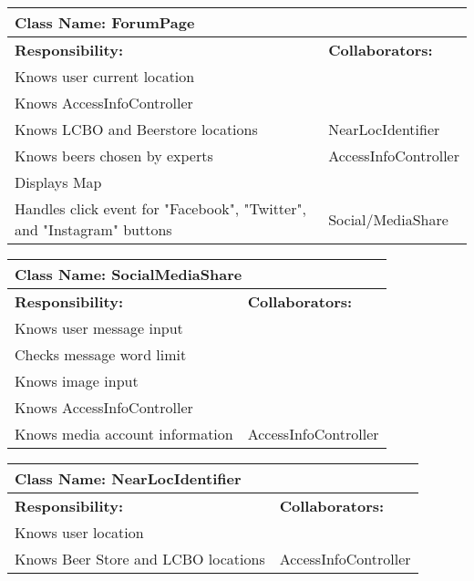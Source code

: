 \documentclass[]{article}
\begin{document}
	\begin{table}[ht]
		\centering
		\begin{tabular}{|p{5cm}|p{5cm}|}
		\hline 
		\multicolumn{2}{|l|}{\textbf{Class Name: ForumPage}} \\
		\hline
		\textbf{Responsibility:} & \textbf{Collaborators:} \\
		\hline
		Knows user current location  & \\
		\hline
		Knows AccessInfoController & \\
		\hline
		Knows LCBO and Beerstore locations & NearLocIdentifier\\
		\hline
		Knows beers chosen by experts & AccessInfoController\\
		\hline
	    Displays Map  & \\
	    \hline
		Handles click event for "Facebook", "Twitter", and "Instagram" buttons & Social/MediaShare\\
		\hline
		\end{tabular}
	\end{table}	

	\begin{table}[ht]
		\centering
		\begin{tabular}{|p{5cm}|p{5cm}|}
			\hline 
			\multicolumn{2}{|l|}{\textbf{Class Name: SocialMediaShare}} \\
			\hline
			\textbf{Responsibility:} & \textbf{Collaborators:} \\
			\hline
			Knows user message input  & \\
			\hline
			Checks message word limit & \\
			\hline
			Knows image input & \\
			\hline
			Knows AccessInfoController & \\
			\hline
			Knows media account information & AccessInfoController\\
			\hline 
		\end{tabular}
	\end{table}	
	
	\begin{table}[ht]
		\centering
		\begin{tabular}{|p{5cm}|p{5cm}|}
			\hline 
			\multicolumn{2}{|l|}{\textbf{Class Name: NearLocIdentifier}} \\
			\hline
			\textbf{Responsibility:} & \textbf{Collaborators:} \\
			\hline
			Knows user location & \\
			\hline
			Knows Beer Store and LCBO locations & AccessInfoController\\
			\hline
		\end{tabular}
	\end{table}	
	
\end{document}
